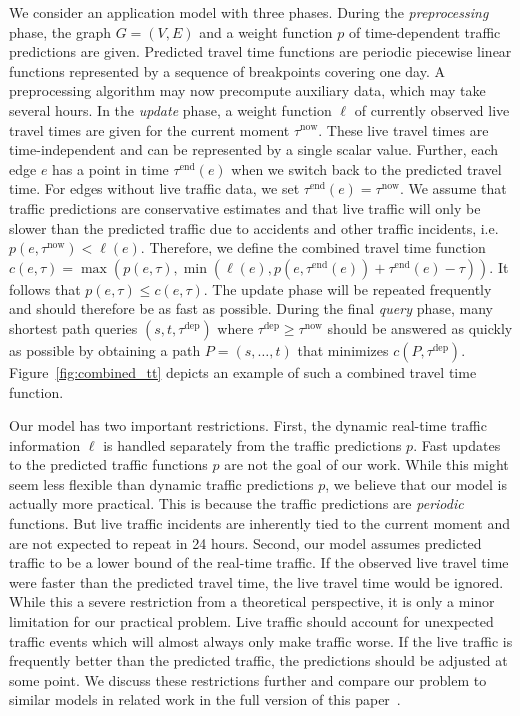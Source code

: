 \documentclass[a4paper,UKenglish,cleveref, autoref, thm-restate]{lipics-v2021}
\newcommand*{\pred}{p}
\newcommand*{\comb}{c}
\newcommand*{\live}{\ell}
\newcommand*{\tdep}{\tau^{\operatorname{dep}}}
\newcommand*{\tend}{\tau^{\operatorname{end}}}
\newcommand*{\tnow}{\tau^{\operatorname{now}}}
\begin{document}
We consider an application model with three phases.
During the \emph{preprocessing} phase, the graph $G=(V,E)$ and a weight function $\pred$ of time-dependent traffic predictions are given.
Predicted travel time functions are periodic piecewise linear functions represented by a sequence of breakpoints covering one day.
A preprocessing algorithm may now precompute auxiliary data, which may take several hours.
In the \emph{update} phase, a weight function $\live$ of currently observed live travel times are given for the current moment $\tnow$.
These live travel times are time-independent and can be represented by a single scalar value.
Further, each edge $e$ has a point in time $\tend(e)$ when we switch back to the predicted travel time.
For edges without live traffic data, we set $\tend(e) = \tnow$.
We assume that traffic predictions are conservative estimates and that live traffic will only be slower than the predicted traffic due to accidents and other traffic incidents, i.e.\ $\pred(e, \tnow) < \live(e)$.
Therefore, we define the combined travel time function $\comb(e, \tau) = \max(\pred(e, \tau), \min(\live(e), \pred(e, \tend(e)) + \tend(e) - \tau))$.
It follows that $\pred(e, \tau) \leq \comb(e, \tau)$.
The update phase will be repeated frequently and should therefore be as fast as possible.
During the final \emph{query} phase, many shortest path queries $(s,t,\tdep)$ where $\tdep \geq \tnow$ should be answered as quickly as possible by obtaining a path $P = (s,\dots,t)$ that minimizes $\comb(P, \tdep)$.
Figure~\ref{fig:combined_tt} depicts an example of such a combined travel time function.

Our model has two important restrictions.
First, the dynamic real-time traffic information $\live$ is handled separately from the traffic predictions $\pred$.
Fast updates to the predicted traffic functions $\pred$ are not the goal of our work.
While this might seem less flexible than dynamic traffic predictions $\pred$, we believe that our model is actually more practical.
This is because the traffic predictions are \emph{periodic} functions.
But live traffic incidents are inherently tied to the current moment and are not expected to repeat in 24 hours.
Second, our model assumes predicted traffic to be a lower bound of the real-time traffic.
If the observed live travel time were faster than the predicted travel time, the live travel time would be ignored.
While this a severe restriction from a theoretical perspective, it is only a minor limitation for our practical problem.
Live traffic should account for unexpected traffic events which will almost always only make traffic worse.
If the live traffic is frequently better than the predicted traffic, the predictions should be adjusted at some point.
We discuss these restrictions further and compare our problem to similar models in related work in the full version of this paper~\cite{wz-cplttdap-22}.
\end{document}
